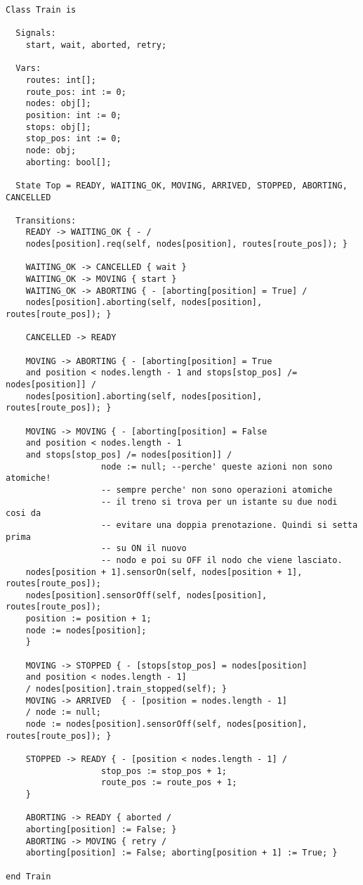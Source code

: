 \begin{lstlisting}[caption={modello della classe Train}]
Class Train is

  Signals:
    start, wait, aborted, retry;

  Vars:
    routes: int[];
    route_pos: int := 0;
    nodes: obj[];
    position: int := 0;
    stops: obj[];
    stop_pos: int := 0;
    node: obj;
    aborting: bool[];

  State Top = READY, WAITING_OK, MOVING, ARRIVED, STOPPED, ABORTING, CANCELLED

  Transitions:
    READY -> WAITING_OK { - / 
    nodes[position].req(self, nodes[position], routes[route_pos]); }

    WAITING_OK -> CANCELLED { wait }  
    WAITING_OK -> MOVING { start }
    WAITING_OK -> ABORTING { - [aborting[position] = True] / 
    nodes[position].aborting(self, nodes[position], routes[route_pos]); }
    
    CANCELLED -> READY

    MOVING -> ABORTING { - [aborting[position] = True 
    and position < nodes.length - 1 and stops[stop_pos] /= nodes[position]] / 
    nodes[position].aborting(self, nodes[position], routes[route_pos]); }
    
    MOVING -> MOVING { - [aborting[position] = False 
    and position < nodes.length - 1 
    and stops[stop_pos] /= nodes[position]] /                    
                   node := null; --perche' queste azioni non sono atomiche!
                   -- sempre perche' non sono operazioni atomiche
                   -- il treno si trova per un istante su due nodi cosi da
                   -- evitare una doppia prenotazione. Quindi si setta prima 
                   -- su ON il nuovo
                   -- nodo e poi su OFF il nodo che viene lasciato.
    nodes[position + 1].sensorOn(self, nodes[position + 1], routes[route_pos]);
    nodes[position].sensorOff(self, nodes[position], routes[route_pos]);
    position := position + 1;
    node := nodes[position];
    }

    MOVING -> STOPPED { - [stops[stop_pos] = nodes[position] 
    and position < nodes.length - 1] 
    / nodes[position].train_stopped(self); }
    MOVING -> ARRIVED  { - [position = nodes.length - 1] 
    / node := null; 
    node := nodes[position].sensorOff(self, nodes[position], routes[route_pos]); }
    
    STOPPED -> READY { - [position < nodes.length - 1] /
                   stop_pos := stop_pos + 1;
                   route_pos := route_pos + 1;
    }
    
    ABORTING -> READY { aborted / 
    aborting[position] := False; }
    ABORTING -> MOVING { retry / 
    aborting[position] := False; aborting[position + 1] := True; }

end Train
\end{lstlisting}
